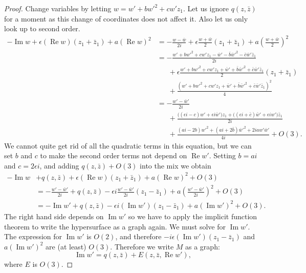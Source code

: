 \documentclass[12pt,openany]{book}
\renewcommand{\Re}{\operatorname{Re}}
\renewcommand{\Im}{\operatorname{Im}}
\theoremstyle{plain}
\theoremstyle{remark}
\theoremstyle{definition}
\theoremstyle{exercise}
\theoremstyle{example}
\begin{document}
\begin{proof}
Change variables
by letting $w = w'+bw'^2+cw'z_1$.  Let us ignore $q(z,\bar{z})$ for a moment as
this change of coordinates does not affect it.  Also let us only look up to
second order.
\begin{equation*}
\begin{split}
-\Im w +
\epsilon (\Re w) (z_1+\bar{z}_1)
+
a {(\Re w)}^2
& =
-\frac{w-\bar{w}}{2i} +
\epsilon \frac{w+\bar{w}}{2}(z_1+\bar{z}_1)
+
a{\left(\frac{w+\bar{w}}{2}\right)}^2
\\
& =
-\frac{w'+bw'^2+cw'z_1-\bar{w}'-\bar{b}\bar{w}'^2-\bar{c}\bar{w}'\bar{z}_1}{2i} 
\\
& \phantom{=}~
+\epsilon \frac{w'+bw'^2+cw'z_1+\bar{w}'+\bar{b}\bar{w}'^2+\bar{c}\bar{w}'\bar{z}_1}{2}(z_1+\bar{z}_1)
\\
& \phantom{=}~
+ \frac{{(w'+bw'^2+cw'z_1+\bar{w}'+\bar{b}\bar{w}'^2+\bar{c}\bar{w}'\bar{z}_1)}^2}{4}
\\
& =
-\frac{w'-\bar{w}'}{2i} 
\\
& \phantom{=}~
+\frac{
\bigl((\epsilon i-c)w'
+\epsilon i\bar{w}'\bigr)z_1
+\bigl((\epsilon i+\bar{c})\bar{w}'
+\epsilon iw'\bigr)\bar{z}_1
}{2i}
\\
& \phantom{=}~
+ \frac{(ai-2b)w'^2+(ai+2\bar{b})\bar{w}'^2+2iaw'\bar{w}'}{4i}
+O(3) .
\end{split}
\end{equation*}
We cannot quite get rid of all the quadratic terms in this equation, but we can set
$b$ and $c$ to make the second order terms not depend on $\Re w'$.
Setting $b=ai$ and $c=2\epsilon i$, and adding $q(z,\bar{z}) + O(3)$ into the mix we obtain
\begin{equation*}
\begin{split}
-\Im w & +
q(z,\bar{z}) +
\epsilon (\Re w) (z_1+\bar{z}_1)
+ a{(\Re w)}^2
+O(3)
\\
& =
-\frac{w'-\bar{w}'}{2i} 
+
q(z,\bar{z}) 
- \epsilon i
\frac{w' -\bar{w}'}{2i}
( z_1 -\bar{z}_1)
+ a {\left(\frac{w'-\bar{w}'}{2i}\right)}^2
+O(3)
\\
& =
-\Im w'
+ q(z,\bar{z})
-
\epsilon i
(\Im w')
( z_1 -\bar{z}_1)
+
a {(\Im w')}^2
+O(3) .
\end{split}
\end{equation*}
The right hand side depends on $\Im w'$ so we have to apply the implicit
function theorem to write the hypersurface as a graph again. We must solve
for $\Im w'$.  The expression for $\Im w'$
is $O(2)$, and therefore $-i\epsilon (\Im w')(z_1-\bar{z}_1)$ 
and $a{(\Im w')}^2$ are (at least) $O(3)$.
Therefore we write $M$ as a graph:
\begin{equation*}
\Im w' = q(z,\bar{z}) + E(z,\bar{z},\Re w'),
\end{equation*}
where $E$ is $O(3)$.


\end{proof}
\end{document}
